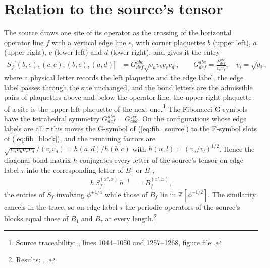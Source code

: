 \documentclass{article}
\begin{document}
\section{Relation to the source's tensor}
The source draws one site of its operator as the crossing of the horizontal
operator line $f$ with a vertical edge line $e$, with corner plaquettes $b$
(upper left), $a$ (upper right), $c$ (lower left) and $d$ (lower right), and
gives it the entry
\begin{align}
    S_f\bigl[(b,e),(c,e);(b,c),(a,d)\bigr]
     & =G^{abc}_{def}\sqrt{v_av_bv_cv_d},
    \qquad G^{abc}_{def}=\frac{F^{abc}_{def}}{v_ev_f},\quad v_i=\sqrt{d_i},
    \label{eq:fib_source}
\end{align}
where a physical letter records the left plaquette and the edge label, the
edge label passes through the site unchanged, and the bond letters are the
admissible pairs of plaquettes above and below the operator line; the
upper-right plaquette of a site is the upper-left plaquette of the next
one.\footnote{Source traceability:
    , lines 1044--1050 and
    1257--1268, figure file .}
The Fibonacci G-symbols have the tetrahedral symmetry
$G^{abc}_{def}=G^{fce}_{abd}$. On the configurations whose edge labels are all
$\tau$ this moves the G-symbol of (\ref{eq:fib_source}) to the F-symbol slots
of (\ref{eq:fib_block}), and the remaining factors are
$\sqrt{v_av_bv_cv_d}/(v_bv_d)=h(a,d)/h(b,c)$ with
$h(u,l)=(v_u/v_l)^{1/2}$. Hence the diagonal bond matrix $h$ conjugates every
letter of the source's tensor on edge label $\tau$ into the corresponding letter
of $B_1$ or $B_\tau$,
\begin{align}
    h\,S_f^{(x',x)}\,h^{-1} & =B_f^{(x',x)},
    \label{eq:fib_conj}
\end{align}
the entries of $S_f$ involving $\phi^{\pm1/4}$ while those of $B_f$ lie in
$\mathbb{Z}[\phi^{-1/2}]$. The similarity cancels in the trace, so on edge label
$\tau$ the periodic operators of the source's blocks equal those of $B_1$ and
$B_\tau$ at every length.\footnote{Results:
    ,
    .}
\end{document}
